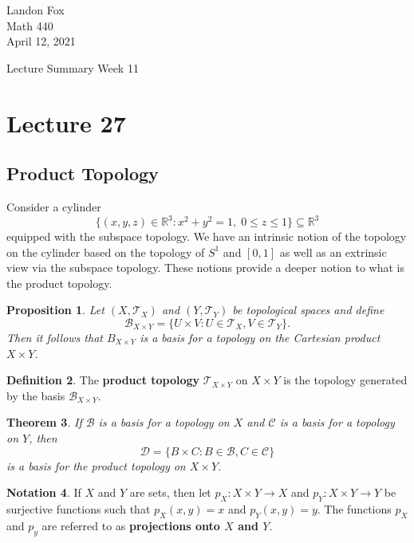 \documentclass[ 12pt ]{article}
\newcounter{lecture_num}
\theoremstyle{plain}
\theoremstyle{plain}
\newtheorem{theorem}{Theorem}[lecture_num]
\newtheorem{proposition}[theorem]{Proposition}
\theoremstyle{definition}
\newtheorem{definition}[theorem]{Definition}
\newtheorem{notation}[theorem]{Notation}
\theoremstyle{remark}
\begin{document}
\noindent Landon Fox \\
\noindent Math 440 \\
\noindent April 12, 2021

\begin{center}
	\Large Lecture Summary Week 11
\end{center}

\setcounter{lecture_num}{27}
\setcounter{theorem}{0}
\section*{Lecture 27}

\subsection*{Product Topology}

Consider a cylinder $$\{ (x, y, z) \in \mathbb{R}^3 : x^2 + y^2 = 1,\; 0 \leq z \leq 1 \} \subseteq \mathbb{R}^3$$ equipped with the subspace topology. We have an intrinsic notion of the
topology on the cylinder based on the topology of $S^1$ and $[0, 1]$ as well as an extrinsic view via the subspace topology. These notions provide a deeper notion to what is the product
topology.

\begin{proposition}
	Let $(X, \mathcal{T}_X)$ and $(Y, \mathcal{T}_Y)$ be topological spaces and define $$\mathcal{B}_{X \times Y} = \{ U \times V : U \in \mathcal{T}_X, V \in \mathcal{T}_Y \}.$$ Then it
	follows that $B_{X \times Y}$ is a basis for a topology on the Cartesian product $X \times Y$.
\end{proposition}

\begin{definition}
	The \textbf{product topology} $\mathcal{T}_{X \times Y}$ on $X \times Y$ is the topology generated by the basis $\mathcal{B}_{X \times Y}$.
\end{definition}

\begin{theorem}
	If $\mathcal{B}$ is a basis for a topology on $X$ and $\mathcal{C}$ is a basis for a topology on $Y$, then $$\mathcal{D} = \{ B \times C : B \in \mathcal{B}, C \in \mathcal{C} \}$$
	is a basis for the product topology on $X \times Y$.
\end{theorem}

\begin{notation}
	If $X$ and $Y$ are sets, then let $p_X : X \times Y \to X$ and $p_Y : X \times Y \to Y$ be surjective functions such that $p_X(x, y) = x$ and $p_Y(x, y) = y$. The functions $p_X$ and
	$p_y$ are referred to as \textbf{projections onto $X$ and $Y$}.
\end{notation}
\end{document}
